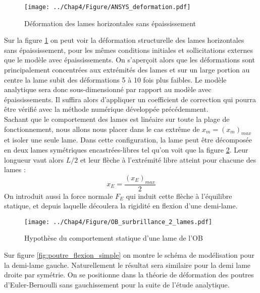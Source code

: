 \begin{figure}[!htbp]
\begin{center}
    \captionsetup{justification=centering}
	\texttt{[image: ../Chap4/Figure/ANSYS\_deformation.pdf]}
	\caption{Déformation des lames horizontales sans épaississement}
	\label{fig:ANSYS_deformation}
\end{center}
\end{figure}
Sur la figure \ref{fig:ANSYS_deformation} on peut voir la déformation structurelle des lames horizontales sans épaississement, pour les mêmes conditions initiales et sollicitations externes que le modèle avec épaississements. On s'aperçoit alors que les déformations sont principalement concentrées aux extrémités des lames et sur un large portion au centre la lame subit des déformations 5 à 10 fois plus faibles. Le modèle analytique sera donc sous-dimensionné par rapport au modèle avec épaississements. Il suffira alors d'appliquer un coefficient de correction qui pourra être vérifié avec la méthode numérique développée précédemment.\\
	Sachant que le comportement des lames est linéaire sur toute la plage de fonctionnement, nous allons nous placer dans le cas extrême de $x_m = (x_m)_{max}$ et isoler une seule lame. Dans cette configuration, la lame peut être décomposée en deux lames symétriques encastrées-libres tel qu'on voit que la figure \ref{fig:OB_surbrillance_2_lames}. Leur longueur vaut alors $L/2$ et leur flèche à l'extrémité libre atteint pour chacune des lames :
\begin{equation}
		x_E =\frac{(x_E)_{max}}{2}
\label{eq:x_E=x_max/2}
\end{equation}
On introduit aussi la force normale $F_E$ qui induit cette flèche à l'équilibre statique, et depuis laquelle découlera la rigidité en flexion d'une demi-lame.\\
\begin{figure}[!htbp]
\begin{center}
    \captionsetup{justification=centering}
	\texttt{[image: ../Chap4/Figure/OB\_surbrillance\_2\_lames.pdf]}
	\caption{Hypothèse du comportement statique d'une lame de l'OB}
	\label{fig:OB_surbrillance_2_lames}
\end{center}
\end{figure}
Sur figure \ref{fig:poutre_flexion_simple} on montre le schéma de modélisation pour la demi-lame gauche. Naturellement le résultat sera similaire pour la demi lame droite par symétrie. On se positionne dans la théorie de déformation des poutres d'Euler-Bernoulli sans gauchissement pour la suite de l'étude analytique. 
